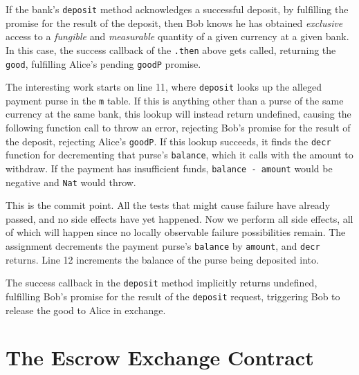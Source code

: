 \documentclass{llncs}
\begin{document}
If the bank's {\tt deposit} method acknowledges a successful deposit, by fulfilling the promise for the result of the deposit, then Bob knows he has obtained \emph{exclusive} access to a \emph{fungible} and \emph{measurable} quantity of a given currency at a given bank. In this case, the success callback of the {\tt .then} above gets called, returning the {\tt good}, fulfilling Alice's pending {\tt goodP} promise.

The interesting work starts on line 11, where {\tt deposit} looks up the alleged payment purse in the {\tt m} table. If this is anything other than a purse of the same currency at the same bank, this lookup will instead return undefined, causing the following function call to throw an error, rejecting Bob's promise for the result of the deposit, rejecting Alice's {\tt goodP}. If this lookup succeeds, it finds the {\tt decr} function for decrementing that purse's {\tt balance}, which it calls with the amount to withdraw. If the payment has insufficient funds, {\tt balance - amount} would be negative and {\tt Nat} would throw.

This is the commit point. All the tests that might cause failure have already passed, and no side effects have yet happened. Now we perform all side effects, all of which will happen since no locally observable failure possibilities remain. The assignment decrements the payment purse's {\tt balance} by {\tt amount}, and {\tt decr} returns. Line 12 increments the balance of the purse being deposited into.

The success callback in the {\tt deposit} method implicitly returns undefined, fulfilling Bob's promise for the result of the {\tt deposit} request, triggering Bob to release the good to Alice in exchange.



\section{The Escrow Exchange Contract}
\label{exchange}
\end{document}
